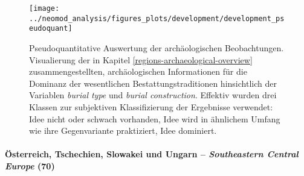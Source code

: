 \documentclass[openany,twoside,twocolumn]{book}
\begin{document}
\begin{figure}[!t]

{\centering \texttt{[image: ../neomod\_analysis/figures\_plots/development/development\_pseudoquant]} 

}

\caption[Pseudoquantitative Auswertung der archäologischen Beobachtungen]{Pseudoquantitative Auswertung der archäologischen Beobachtungen. Visualierung der in Kapitel \ref{regions-archaeological-overview} zusammengestellten, archäologischen Informationen für die Dominanz der wesentlichen Bestattungstraditionen hinsichtlich der Variablen \textit{burial type} und \textit{burial construction}. Effektiv wurden drei Klassen zur subjektiven Klassifizierung der Ergebnisse verwendet: Idee nicht oder schwach vorhanden, Idee wird in ähnlichem Umfang wie ihre Gegenvariante praktiziert, Idee dominiert.}\label{fig:development-proportions-regions-pseudoquant}
\end{figure}

\hypertarget{osterreich-tschechien-slowakei-und-ungarn-southeastern-central-europe-70}{%
\paragraph{\texorpdfstring{Österreich, Tschechien, Slowakei und Ungarn
-- \emph{Southeastern Central Europe}
(70)}{Österreich, Tschechien, Slowakei und Ungarn -- Southeastern Central Europe (70)}}\label{osterreich-tschechien-slowakei-und-ungarn-southeastern-central-europe-70}}
\end{document}
